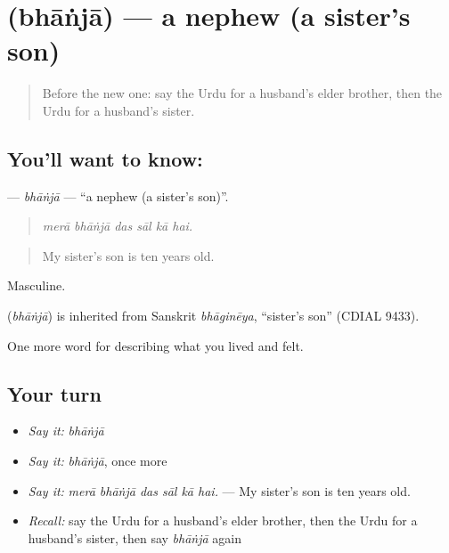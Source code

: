 \section[\texorpdfstring{\ur{بھانجا} (bhāṅjā)}{بھانجا (bhāṅjā)}]{ (bhāṅjā) — a nephew (a sister's son)}

\label{lesson:UR-C489-bhanja}



\begin{quote}
Before the new one: say the Urdu for a husband's elder brother, then the Urdu for a husband's sister.
\end{quote}

\subsection*{You'll want to know: }
\textbf{} — \emph{bhāṅjā} — \textquotedblleft{}a nephew (a sister's son)\textquotedblright{}.

\begin{quote}
     
\end{quote}

\begin{quote}
\emph{merā bhāṅjā das sāl kā hai.}
\end{quote}

\begin{quote}
My sister's son is ten years old.
\end{quote}

Masculine.

\begin{cousinweb}
\textbf{} (\emph{bhāṅjā}) is inherited from Sanskrit \emph{bhāginēya}, \textquotedblleft{}sister's son\textquotedblright{} (CDIAL 9433).
\end{cousinweb}

\begin{grammarlens}[title={What you've built}]
One more word for describing what you lived and felt.
\end{grammarlens}

\subsection*{Your turn}
\begin{itemize}
\raggedright
  \item \emph{Say it:} \emph{bhāṅjā}
  \item \emph{Say it:} \emph{bhāṅjā}, once more
  \item \emph{Say it:} \emph{merā bhāṅjā das sāl kā hai.} — My sister's son is ten years old.
  \item \emph{Recall:} say the Urdu for a husband's elder brother, then the Urdu for a husband's sister, then say \emph{bhāṅjā} again
\end{itemize}

